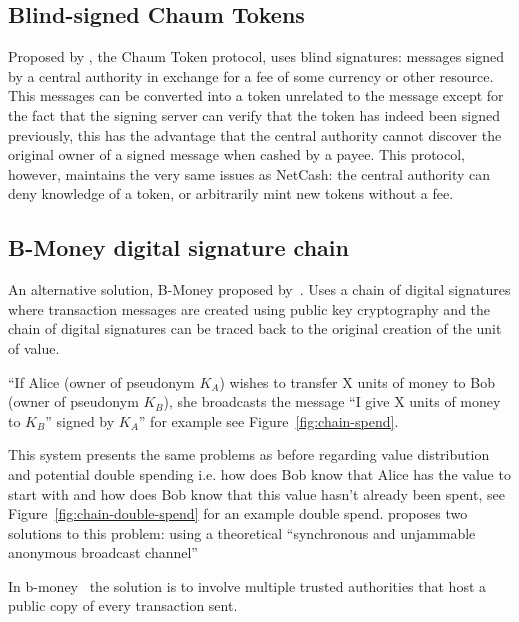 \subsection{Blind-signed Chaum Tokens}
Proposed by \textcite{chaum}, the Chaum Token protocol, uses blind signatures: messages signed by a central authority in exchange for a fee of some currency or other resource. This messages can be converted into a token unrelated to the message except for the fact that the signing server can verify that the token has indeed been signed previously, this has the advantage that the central authority cannot discover the original owner of a signed message when cashed by a payee.  This protocol, however, maintains the very same issues as NetCash: the central authority can deny knowledge of a token, or arbitrarily mint new tokens without a fee.


\subsection{B-Money digital signature chain}\label{digital-sig}
An alternative solution, B-Money proposed by~\textcite{b-money}. Uses a chain of digital signatures where transaction messages are created using public key cryptography and the chain of digital signatures can be traced back to the original creation of the unit of value.

``If Alice (owner of pseudonym $K_A$) wishes to transfer X units of money to Bob (owner of pseudonym $K_B$), she broadcasts the message ``I give X units of money to $K_B$'' signed by $K_A$'' for example see Figure~\ref{fig:chain-spend}.

This system presents the same problems as before regarding value distribution and potential double spending i.e. how does Bob know that Alice has the value to start with and how does Bob know that this value hasn't already been spent, see Figure~\ref{fig:chain-double-spend} for an example double spend. \textcite{b-money} proposes two solutions to this problem: using a theoretical ``synchronous and unjammable anonymous broadcast channel''


In b-money~\cite{b-money} the solution is to involve multiple trusted authorities that host a public copy of every transaction sent.

